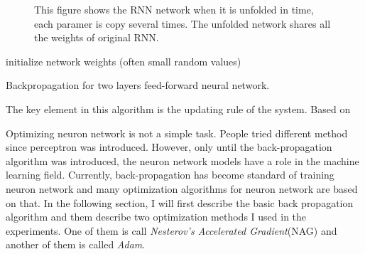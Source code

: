 \documentclass[officiallayout]{tktla}
\begin{document}
\begin{figure}[h!]
  \caption{This figure shows the RNN network when it is unfolded in time, each paramer is copy several times. The unfolded network shares all the weights of original RNN.}\label{shared_bp}
\end{figure}

\begin{algorithm}
 initialize network weights (often small random values)\;
 \caption{Backpropagation for two layers feed-forward neural network.}\label{backpropagation}
\end{algorithm}

The key element in this algorithm is the updating rule of the system. Based on 




Optimizing neuron network is not a simple task. People tried different method since perceptron was introduced. However, only until the back-propagation algorithm was introduced, the neuron network models have a role in the machine learning field. Currently, back-propagation has become standard of training neuron network and many optimization algorithms for neuron network are based on that. In the following section, I will first describe the basic back propagation algorithm and them describe two optimization methods I used in the experiments. One of them is call \textit{Nesterov's Accelerated Gradient}(NAG) and another of them is called \textit{Adam}. 
\end{document}
